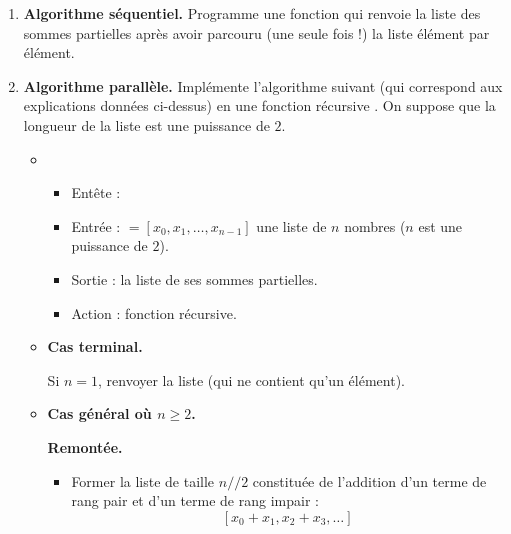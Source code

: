 \documentclass[11pt,class=report,crop=false]{standalone}
\begin{document}
\begin{activite}




  \begin{enumerate}
    \item \textbf{Algorithme séquentiel.} Programme une fonction  qui renvoie la liste des sommes partielles après avoir parcouru (une seule fois !) la liste élément par élément.
    
        
    \item \textbf{Algorithme parallèle.} Implémente l'algorithme suivant (qui correspond aux explications données  ci-dessus) en une fonction récursive .
On suppose que la longueur de la liste est une puissance de $2$.    
\begin{algorithme}
\sauteligne 
\begin{itemize}
 
  \item 
  \begin{itemize}
    \item Entête : 
    \item Entrée : $=[x_0,x_1,\ldots,x_{n-1}]$ une liste de $n$ nombres
    ($n$ est une puissance de $2$).
    \item Sortie : la liste de ses sommes partielles.
    \item Action : fonction récursive.
  \end{itemize} 
  
  \item \textbf{Cas terminal.}
  
  Si $n=1$, renvoyer la liste (qui ne contient qu'un élément).
  

   
  \item \textbf{Cas général où $n\ge2$.}
  
  \textbf{Remontée.}
  
  
  
  \begin{itemize}

    \item Former la liste  de taille $n//2$ constituée de l'addition d'un terme de rang pair et d'un terme de rang impair :
  $$[x_0+x_1,x_2+x_3,\ldots]$$
     

\end{itemize}
\end{itemize}
\end{algorithme}
\end{enumerate}
\end{activite}
\end{document}
